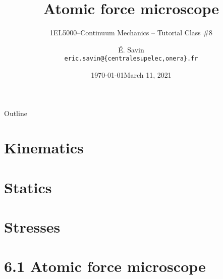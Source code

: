 \documentclass{beamer}
\title[1EL5000/S8]
{Atomic force microscope}
\subtitle{1EL5000--Continuum Mechanics -- Tutorial Class \#8} %
\author[\'E. Savin] %
{\'E. Savin\inst{1,2}\\ \scriptsize{\texttt{eric.savin@\{centralesupelec,onera\}.fr}}}%
\institute[Onera] %
{\inst{1}{Information Processing and Systems Dept.\\\Onera, France}
\and
 \inst{2}{Mechanical and Civil Engineering Dept.\\\ECP, France}}%
\date{\today}
\date{March 11, 2021}
\begin{document}
\begin{frame}
  \titlepage
\end{frame}

\begin{frame}{Outline}
  \tableofcontents
\end{frame}




\section{Kinematics}


\section{Statics}


\section{Stresses}


\section{6.1 Atomic force microscope}
\end{document}
